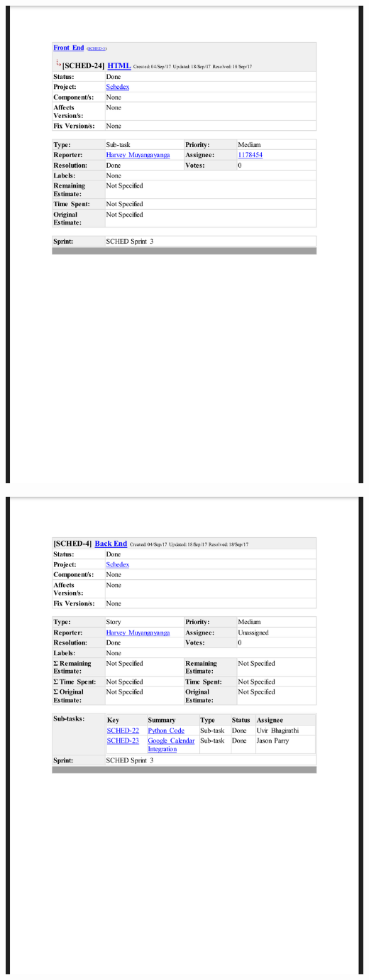 \documentclass{article}
\begin{document}
\centerline{\includegraphics[scale=0.4]{sprint3_4}}

\centerline{\includegraphics[scale=0.4]{sprint3_5}}
\end{document}
